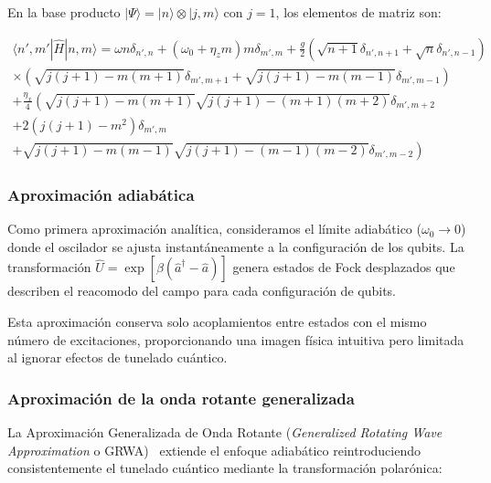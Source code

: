 \documentclass[onecolumn,notitlepage,letterpaper,aps,pra,12pt]{article}
\numberwithin{equation}{section}
\begin{document}
En la base producto $|\Psi\rangle = |n\rangle \otimes |j, m\rangle$ con $j=1$, los elementos de matriz son:

\small{ 
\begin{gather}
    \langle n', m' | \hat{H} | n, m \rangle 
    = \omega n\delta_{n',n} + \left(\omega_{0} + \eta_{z}m\right) m\delta_{m',m} 
    + \frac{g}{2}\left( \sqrt{n+1}\delta_{n',n+1} + \sqrt{n}\delta_{n',n-1} \right) \nonumber \\
    \times\left(\sqrt{j(j+1) - m(m+1)}\delta_{m',m+1} + \sqrt{j(j+1) - m(m-1)}\delta_{m',m-1}\right) \nonumber \\
    +\frac{\eta_{x}}{4}\left(\sqrt{j(j+1)-m(m+1)}\sqrt{j(j+1)-(m+1)(m+2)}\delta_{m',m+2} \right. \nonumber \\
    \left. +2\left(j(j+1) - m^{2}\right)\delta_{m',m} \right. \nonumber \\
    \left. +\sqrt{j(j+1) - m(m-1)}\sqrt{j(j+1)-(m-1)(m-2)}\delta_{m',m-2}\right) \label{numerica two qubit}
\end{gather}}   

\subsubsection{Aproximación adiabática}

Como primera aproximación analítica, consideramos el límite adiabático ($\omega_0 \rightarrow 0$) donde el oscilador se ajusta instantáneamente a la configuración de los qubits. La transformación $\hat{U} = \exp\left[{\beta(\hat{a}^{\dagger}-\hat{a})}\right]$ genera estados de Fock desplazados que describen el reacomodo del campo para cada configuración de qubits.

Esta aproximación conserva solo acoplamientos entre estados con el mismo número de excitaciones, proporcionando una imagen física intuitiva pero limitada al ignorar efectos de tunelado cuántico.

\subsubsection{Aproximación de la onda rotante generalizada}

La Aproximación Generalizada de Onda Rotante (\textit{Generalized Rotating Wave Approximation} o GRWA)~\cite{irish2007,albert2011,yu2012,zhang2015,zhangyu2016,zhangyu2017} extiende el enfoque adiabático reintroduciendo consistentemente el tunelado cuántico mediante la transformación polarónica:
\end{document}
